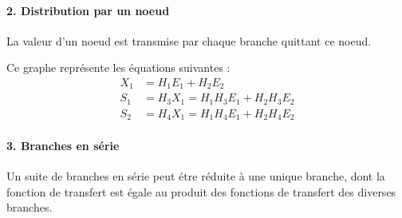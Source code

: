 \paragraph{2. Distribution par un noeud}

La valeur d'un noeud est transmise par chaque branche quittant ce noeud.
\begin{center}
\end{center}

Ce graphe représente les équations suivantes :
\begin{align*}
    X_1&=H_1E_1+H_2E_2\\
    S_1&=H_3X_1=H_1H_3E_1+H_2H_3E_2\\
    S_2&=H_4X_1=H_1H_4E_1+H_2H_4E_2
\end{align*}


\paragraph{3. Branches en série}
Un suite de branches en série peut étre réduite à une unique branche, dont la fonction de transfert est égale 
au produit des fonctions de transfert des diverses branches.

\begin{center}
\end{center}


